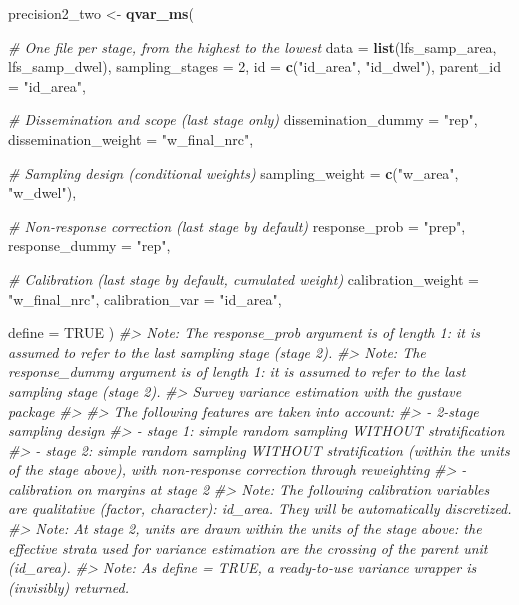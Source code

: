 \documentclass[
]{article}
\newenvironment{Shaded}{\begin{snugshade}}{\end{snugshade}}
\newcommand{\AttributeTok}[1]{\textcolor[rgb]{0.13,0.29,0.53}{#1}}
\newcommand{\CommentTok}[1]{\textcolor[rgb]{0.56,0.35,0.01}{\textit{#1}}}
\newcommand{\ConstantTok}[1]{\textcolor[rgb]{0.56,0.35,0.01}{#1}}
\newcommand{\DecValTok}[1]{\textcolor[rgb]{0.00,0.00,0.81}{#1}}
\newcommand{\FunctionTok}[1]{\textcolor[rgb]{0.13,0.29,0.53}{\textbf{#1}}}
\newcommand{\NormalTok}[1]{#1}
\newcommand{\OtherTok}[1]{\textcolor[rgb]{0.56,0.35,0.01}{#1}}
\newcommand{\StringTok}[1]{\textcolor[rgb]{0.31,0.60,0.02}{#1}}
\begin{document}
\begin{Shaded}
\begin{Highlighting}[]
\NormalTok{precision2\_two }\OtherTok{\textless{}{-}} \FunctionTok{qvar\_ms}\NormalTok{(}
  
  \CommentTok{\# One file per stage, from the highest to the lowest}
  \AttributeTok{data =} \FunctionTok{list}\NormalTok{(lfs\_samp\_area, lfs\_samp\_dwel),}
  \AttributeTok{sampling\_stages =} \DecValTok{2}\NormalTok{,}
  \AttributeTok{id =} \FunctionTok{c}\NormalTok{(}\StringTok{"id\_area"}\NormalTok{, }\StringTok{"id\_dwel"}\NormalTok{),}
  \AttributeTok{parent\_id =} \StringTok{"id\_area"}\NormalTok{,}
  
  \CommentTok{\# Dissemination and scope (last stage only)}
  \AttributeTok{dissemination\_dummy =} \StringTok{"rep"}\NormalTok{,}
  \AttributeTok{dissemination\_weight =} \StringTok{"w\_final\_nrc"}\NormalTok{,}
  
  \CommentTok{\# Sampling design (conditional weights)}
  \AttributeTok{sampling\_weight =} \FunctionTok{c}\NormalTok{(}\StringTok{"w\_area"}\NormalTok{, }\StringTok{"w\_dwel"}\NormalTok{),}
  
  \CommentTok{\# Non{-}response correction (last stage by default)}
  \AttributeTok{response\_prob =} \StringTok{"prep"}\NormalTok{,}
  \AttributeTok{response\_dummy =} \StringTok{"rep"}\NormalTok{,}

  \CommentTok{\# Calibration (last stage by default, cumulated weight)}
  \AttributeTok{calibration\_weight =} \StringTok{"w\_final\_nrc"}\NormalTok{,}
  \AttributeTok{calibration\_var =} \StringTok{"id\_area"}\NormalTok{,}
  
  \AttributeTok{define =} \ConstantTok{TRUE}
\NormalTok{)}
\CommentTok{\#\textgreater{} Note: The response\_prob argument is of length 1: it is assumed to refer to the last sampling stage (stage 2).}
\CommentTok{\#\textgreater{} Note: The response\_dummy argument is of length 1: it is assumed to refer to the last sampling stage (stage 2).}
\CommentTok{\#\textgreater{} Survey variance estimation with the gustave package}
\CommentTok{\#\textgreater{} }
\CommentTok{\#\textgreater{} The following features are taken into account:}
\CommentTok{\#\textgreater{}   {-} 2{-}stage sampling design}
\CommentTok{\#\textgreater{}   {-} stage 1: simple random sampling WITHOUT stratification}
\CommentTok{\#\textgreater{}   {-} stage 2: simple random sampling WITHOUT stratification (within the units of the stage above), with non{-}response correction through reweighting}
\CommentTok{\#\textgreater{}   {-} calibration on margins at stage 2}
\CommentTok{\#\textgreater{} Note: The following calibration variables are qualitative (factor, character): id\_area. They will be automatically discretized.}
\CommentTok{\#\textgreater{} Note: At stage 2, units are drawn within the units of the stage above: the effective strata used for variance estimation are the crossing of the parent unit (id\_area).}
\CommentTok{\#\textgreater{} Note: As define = TRUE, a ready{-}to{-}use variance wrapper is (invisibly) returned.}


\end{Highlighting}
\end{Shaded}
\end{document}
